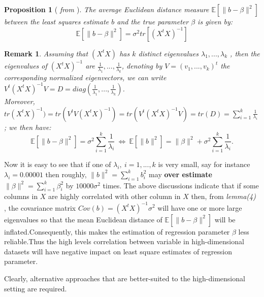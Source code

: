 \documentclass[12pt]{report}
\newtheorem {proposition}{Proposition}[section]  %
\newtheorem{remarque}{Remark}[section]
\begin{document}
\begin{proposition}[ \textit{ from \cite{ref4}} ]
	The  average Euclidean distance measure $\mathbb{E}[\parallel b-\beta \parallel^{2}]$ between the least squares estimate $b$ and the true parameter $\beta$ is given by:
	\begin{equation}
		\mathbb{E}[\parallel b-\beta \parallel^{2}]=\sigma^{2}tr[(X^{t}X)^{-1}]
		\label{f8}
	\end{equation}
\end{proposition}
	\begin{remarque}
	Assuming that $(X^{t}X)$ has $k$ distinct eigenvalues $\lambda_{1},...,\lambda_{k}$ , then the eigenvalues of $(X^{t}X)^{-1}$ are $\frac{1}{\lambda_{1}},...,\frac{1}{\lambda_{k}}$, denoting by $ V=(v_{1},...,v_{k})^{t}$ the corresponding normalized eigenvectors, we can write $V^{t}(X^{t}X)^{-1}V=D=diag(\frac{1}{\lambda_{1}},...,\frac{1}{\lambda_{k}})$.\\ Moreover, $tr(X^{t}X)^{-1})=tr(V^{t}V(X^{t}X)^{-1})=tr(V^{t}(X^{t}X)^{-1}V)=tr(D)=\sum_{i=1}^{k}\frac{1}{\lambda_{i}}$ ; we then have:
	\begin{equation}
		\mathbb{E}[\parallel b-\beta \parallel^{2}]=\sigma^{2}\sum_{i=1}^{k}\frac{1}{\lambda_{i}}\  \Leftrightarrow\ \mathbb{E}[\parallel b \parallel^{2}]=\parallel \beta \parallel^{2} + \sigma^{2}\sum_{i=1}^{k}\frac{1}{\lambda_{i}}.
		\label{f9}
	\end{equation}	
\end{remarque}

Now it is easy to see that if one of $\lambda_{i} ,\ i=1,...,k$ is very small, say for instance $\lambda_{i}=0.00001$ then roughly, $\parallel b \parallel^{2}=\sum_{i=1}^{k}b_{i}^{2}$ may \textbf{over estimate} $\parallel \beta \parallel^{2}=\sum_{i=1}^{k}\beta_{i}^{2}$ by $10000\sigma^{2}$ times.\newline
The above discussions indicate that if some columns in $X$ are highly correlated with other column in $X$ then, from \textit{lemma(4)} , the covariance matrix $Cov(b)=(X^{t}X)^{-1}\sigma^{2}$ will have one or more large eigenvalues so that the mean Euclidean distance of $\mathbb{E}[\parallel b-\beta \parallel^{2}]$ will be inflated.Consequently, this makes the estimation of regression parameter $\beta$ less reliable.Thus the high levels correlation between variable in high-dimensional datasets will have negative impact on least square estimates of regression parameter.

Clearly, alternative approaches that are better-suited to the high-dimensional setting are required.
\end{document}
